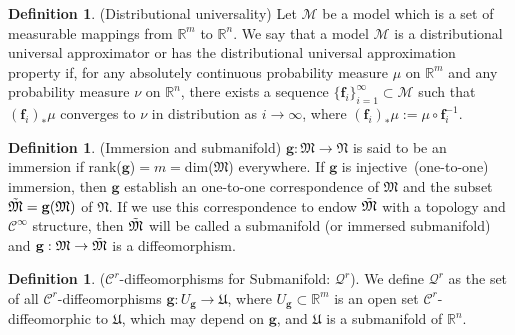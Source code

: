 \documentclass[sigconf, anonymous, review]{acmart}
\theoremstyle{plain}
\theoremstyle{definition}
\newtheorem{definition}[theorem]{Definition}
\theoremstyle{remark}
\begin{document}
\begin{definition}
(Distributional universality) Let $\mathcal{M}$ be a model which is a set of measurable mappings from $\mathbb{R}^m$ to $\mathbb{R}^n$. We say that a model $\mathcal{M}$  is a distributional universal approximator or has the distributional universal approximation property if, for any absolutely continuous probability measure $\mu$ on $\mathbb{R}^m$ and any probability measure $\nu$ on $\mathbb{R}^n$, there exists a sequence $\{\mathbf{f}_i\}^{\infty}_{i=1} \subset \mathcal{M}$ such that $(\mathbf{f}_i)_*\mu$ converges to $\nu$ in distribution as $i \rightarrow \infty$, where $(\mathbf{f}_i)_*\mu :=\mu \circ \mathbf{f}_i^{-1}$. 
\end{definition}



\begin{definition}
(Immersion and submanifold) $\mathbf{g}:\mathfrak{M}  \rightarrow \mathfrak{N} $ is said to be an immersion if rank($\mathbf{g}$)$=m=$dim($\mathfrak{M}$) everywhere. If $\mathbf{g}$ is injective~(one-to-one) immersion, then $\mathbf{g}$ establish an one-to-one correspondence of  $\mathfrak{M}$ and the subset $\Tilde{\mathfrak{M}} = \mathbf{g}(\mathfrak{M})$ of $\mathfrak{N}$. If we use this correspondence to endow $\Tilde{\mathfrak{M}}$ with a topology and $\mathcal{C}^{\infty}$ structure, then $\Tilde{\mathfrak{M}}$ will be called a submanifold (or immersed submanifold) and $\mathbf{g}:\mathfrak{M} \rightarrow \Tilde{\mathfrak{M}}$ is a diffeomorphism. 
\end{definition}




\begin{definition}
($\mathcal{C}^r$-diffeomorphisms for Submanifold: $\mathcal{Q}^r$). We define $\mathcal{Q}^r$  as the set of all $\mathcal{C}^r$-diffeomorphisms $\mathbf{g}: U_\mathbf{g} \rightarrow \mathfrak{U} $, where $U_\mathbf{g} \subset \mathbb{R}^m$ is an open set $\mathcal{C}^r$-diffeomorphic to $\mathfrak{U}$, which may depend on $\mathbf{g}$, and $\mathfrak{U}$ is a submanifold of $\mathbb{R}^n$.
\end{definition}
\end{document}

